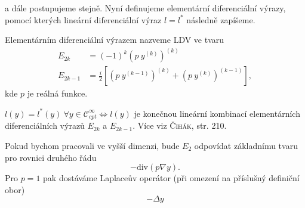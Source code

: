 a dále postupujeme stejně. Nyní definujeme elementární diferenciální výrazy, pomocí kterých lineární diferenciální výraz $l = l^*$ následně zapíšeme.
\begin{definition}
    Elementárním diferenciální výrazem nazveme LDV ve tvaru
    \begin{equation}
        \begin{split}
            E_{2k} &= (-1)^{k} \left(p ~ y^{(k)}\right)^{(k)} \\
            E_{2k-1} &= \frac{i}{2} \left[ \left(p ~ y^{(k-1)}\right)^{(k)} + \left(p ~ y^{(k)}\right)^{(k-1)} \right],
        \end{split}
    \end{equation}
kde $p$ je reálná funkce.
\end{definition}

\begin{theorem}
    $l(y) = l^{*}(y) ~ \forall y \in \mathcal{C}^{\infty}_{cpt} \iff l(y)$ je konečnou lineární kombinací elementárních diferenciálních výrazů  $E_{2k}$ a $E_{2k-1}$. Více viz \textsc{Čihák}, str. 210.
\end{theorem}


\begin{remark}
    Pokud bychom pracovali ve vyšší dimenzi, bude $E_2$ odpovídat základnímu tvaru pro rovnici druhého řádu
    \begin{equation*}
        - \text{div} (p \nabla y).
    \end{equation*}
    Pro $p=1$ pak dostáváme Laplaceův operátor (při omezení na příslušný definiční obor)
    \begin{equation*}
        -\Delta y
    \end{equation*}
\end{remark}

